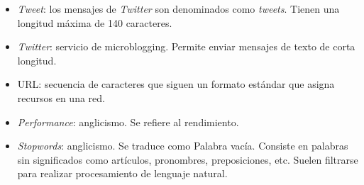 \begin{glosario}
\begin{itemize}
\item \textit{Tweet}: los mensajes de \textit{Twitter} son denominados como \textit{tweets}. Tienen una longitud máxima de 140 caracteres. 
\item \textit{Twitter}: servicio de microblogging. Permite enviar mensajes de texto de corta longitud.
\item URL: secuencia de caracteres que siguen un formato estándar que asigna recursos en una red.
\item \textit{Performance}: anglicismo. Se refiere al rendimiento.
\item \textit{Stopwords}: anglicismo. Se traduce como Palabra vacía. Consiste en palabras sin significados como artículos, pronombres, preposiciones, etc. Suelen filtrarse para realizar procesamiento de lenguaje natural.
\end{itemize}

\end{glosario}

